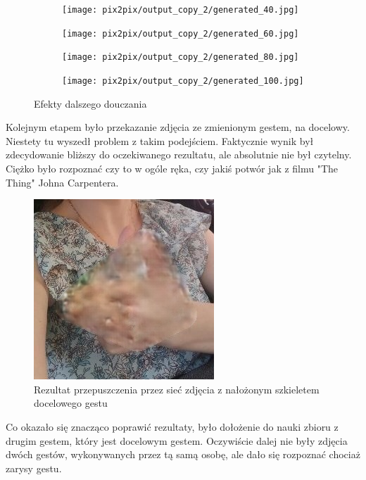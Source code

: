 \documentclass[12pt]{article}
\begin{document}
\begin{sloppypar}
{{\begin{figure}[H]
\begin{subfigure}{.5\textwidth}
        \centering
        \texttt{[image: pix2pix/output\_copy\_2/generated\_40.jpg]}
      \end{subfigure}
      \begin{subfigure}{.5\textwidth}
        \centering
        \texttt{[image: pix2pix/output\_copy\_2/generated\_60.jpg]}
      \end{subfigure}
      \begin{subfigure}{.5\textwidth}
        \centering
        \texttt{[image: pix2pix/output\_copy\_2/generated\_80.jpg]}
      \end{subfigure}
      \begin{subfigure}{.5\textwidth}
        \centering
        \texttt{[image: pix2pix/output\_copy\_2/generated\_100.jpg]}
      \end{subfigure}
      \caption{Efekty dalszego douczania}
    \end{figure}
    Kolejnym etapem było przekazanie zdjęcia ze zmienionym gestem, na docelowy.
    Niestety tu wyszedł problem z takim podejściem. 
    Faktycznie wynik był zdecydowanie bliższy do oczekiwanego rezultatu, ale absolutnie nie był czytelny.
    Ciężko było rozpoznać czy to w ogóle ręka, czy jakiś potwór jak z filmu "The Thing" Johna Carpentera.
    \begin{figure}[H]
      \centering
      \includegraphics{pix2pix/generated_single.jpg}
      \caption{Rezultat przepuszczenia przez sieć zdjęcia z nałożonym szkieletem docelowego gestu}
    \end{figure}

    Co okazało się znacząco poprawić rezultaty, było dołożenie do nauki zbioru z drugim gestem, który jest docelowym gestem. 
    Oczywiście dalej nie były zdjęcia dwóch gestów, wykonywanych przez tą samą osobę, ale dało się rozpoznać chociaż zarysy gestu.

}}
\end{sloppypar}
\end{document}
